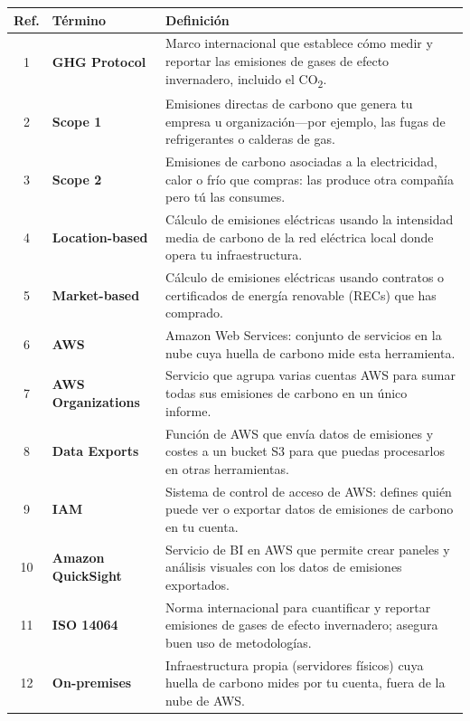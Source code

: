 \documentclass[12pt,a4paper]{report}
\begin{document}
\begin{table}[h]
\centering
\begin{tabular}{@{}cll@{}}
\toprule
\textbf{Ref.} & \textbf{Término} & \textbf{Definición} \\
\midrule
1 & \textbf{GHG Protocol} & Marco internacional que establece cómo medir y reportar las emisiones de gases de efecto invernadero, incluido el CO\textsubscript{2}. \\
2 & \textbf{Scope 1} & Emisiones directas de carbono que genera tu empresa u organización—por ejemplo, las fugas de refrigerantes o calderas de gas. \\
3 & \textbf{Scope 2} & Emisiones de carbono asociadas a la electricidad, calor o frío que compras: las produce otra compañía pero tú las consumes. \\
4 & \textbf{Location-based} & Cálculo de emisiones eléctricas usando la intensidad media de carbono de la red eléctrica local donde opera tu infraestructura. \\
5 & \textbf{Market-based} & Cálculo de emisiones eléctricas usando contratos o certificados de energía renovable (RECs) que has comprado. \\
6 & \textbf{AWS} & Amazon Web Services: conjunto de servicios en la nube cuya huella de carbono mide esta herramienta. \\
7 & \textbf{AWS Organizations} & Servicio que agrupa varias cuentas AWS para sumar todas sus emisiones de carbono en un único informe. \\
8 & \textbf{Data Exports} & Función de AWS que envía datos de emisiones y costes a un bucket S3 para que puedas procesarlos en otras herramientas. \\
9 & \textbf{IAM} & Sistema de control de acceso de AWS: defines quién puede ver o exportar datos de emisiones de carbono en tu cuenta. \\
10 & \textbf{Amazon QuickSight} & Servicio de BI en AWS que permite crear paneles y análisis visuales con los datos de emisiones exportados. \\
11 & \textbf{ISO 14064} & Norma internacional para cuantificar y reportar emisiones de gases de efecto invernadero; asegura buen uso de metodologías. \\
12 & \textbf{On-premises} & Infraestructura propia (servidores físicos) cuya huella de carbono mides por tu cuenta, fuera de la nube de AWS. \\
\bottomrule
\end{tabular}
\end{table}
\end{document}

